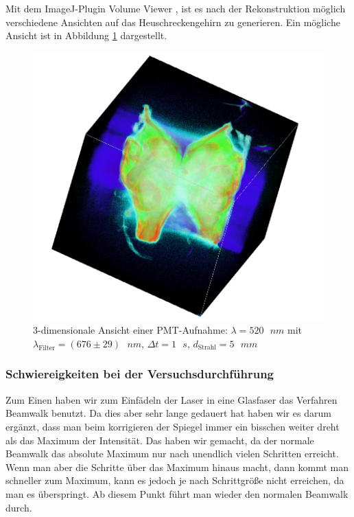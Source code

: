 Mit dem ImageJ-Plugin \glqq Volume Viewer\grqq{} , ist es nach der Rekonstruktion möglich verschiedene Ansichten auf das Heuschreckengehirn zu generieren. Ein mögliche Ansicht ist in Abbildung \ref{fig:3d} dargestellt.

\begin{figure}[H]
\centering
\includegraphics[width=\linewidth]{IMAGE/3dtomo.png}
\caption{3-dimensionale Ansicht einer PMT-Aufnahme: $\lambda = 520 \text{ } \si{nm}$ mit\\ $\lambda_\text{Filter} = (676 \pm 29) \text{ } \si{nm}$, $\Delta{t} = 1 \text{ } \si{s}$, $d_\text{Strahl} = 5 \text{ } \si{mm}$}
	\label{fig:3d}
\end{figure}


\subsubsection{Schwiereigkeiten bei der Versuchsdurchführung}
Zum Einen haben wir zum Einfädeln der Laser in eine Glasfaser das Verfahren Beamwalk benutzt. Da dies aber sehr lange gedauert hat haben wir es darum ergänzt, dass man beim korrigieren der Spiegel immer ein bisschen weiter dreht als das Maximum der Intensität.
Das haben wir gemacht, da der normale Beamwalk das absolute Maximum nur nach unendlich vielen Schritten erreicht.
Wenn man aber die Schritte über das Maximum hinaus macht, dann kommt man schneller zum Maximum, kann es jedoch je nach Schrittgröße nicht erreichen, da man es überspringt.
Ab diesem Punkt führt man wieder den normalen Beamwalk durch.

